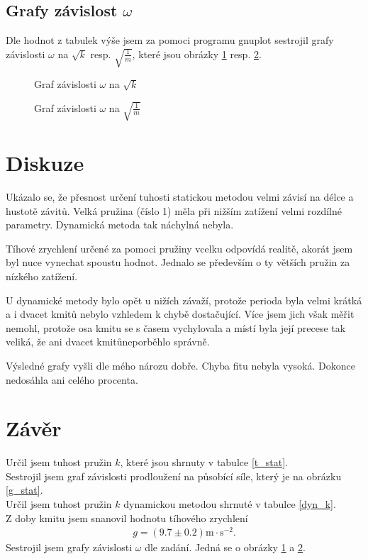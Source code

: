 \documentclass[a4paper,12pt]{article}
\begin{document}
\subsection{Grafy závislost $\omega$}
\noindent
Dle hodnot z tabulek výše jsem za pomoci programu gnuplot sestrojil grafy závislosti $\omega$ na $\sqrt{k}$ resp. 
$\sqrt{\frac{1}{m}}$, které jsou obrázky \ref{graf2} resp. \ref{graf3}.

\begin{figure}
\begin{center}
	
\end{center}
	\caption{Graf závislosti $\omega$ na $\sqrt{k}$}
	\label{graf2}
\end{figure}

\begin{figure}
\begin{center}
	
\end{center}
	\caption{Graf závislosti $\omega$ na $\sqrt{\frac{1}{m}}$}
	\label{graf3}
\end{figure}

\section{Diskuze}
\noindent
Ukázalo se, že přesnost určení tuhosti statickou metodou velmi závisí na délce a hustotě závitů. Velká 
pružina (číslo 1) měla při nižším zatížení velmi rozdílné parametry. Dynamická metoda tak náchylná nebyla. 

Tíhové zrychlení určené za pomoci pružiny vcelku odpovídá realitě, akorát jsem byl nuce vynechat spoustu 
hodnot. Jednalo se především o ty větších pružin za nízkého zatížení.

U dynamické metody bylo opět u nižích závaží, protože perioda byla velmi krátká a i dvacet kmitů nebylo 
vzhledem k chybě dostačující. Více jsem jich však měřit nemohl, protože osa kmitu se s časem vychylovala 
a místí byla její precese tak veliká, že ani dvacet kmitůneporběhlo správně.

Výsledné grafy vyšli dle mého nározu dobře. Chyba fitu nebyla vysoká. Dokonce nedosáhla ani celého procenta.

\section{Závěr}
\noindent
Určil jsem tuhost pružin $k$, které jsou shrnuty v tabulce \ref{t_stat}. \\
Sestrojil jsem graf závislosti prodloužení na působící síle, který je na obrázku \ref{g_stat}. \\
Určil jsem tuhost pružin $k$ dynamickou metodou shrnuté v tabulce \ref{dyn_k}.\\
Z doby kmitu jsem snanovil hodnotu tíhového zrychlení
\begin{eqnarray}
	g=(9.7\pm0.2)\mbox{m}\cdot\mbox{s}^{-2}.
\end{eqnarray}
Sestrojil jsem grafy závislosti $\omega$ dle zadání. Jedná se o obrázky \ref{graf2} a \ref{graf3}.
\end{document}
